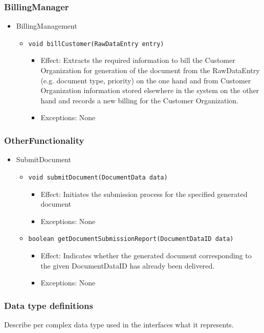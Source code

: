\documentclass[a4paper,10pt]{article}
\begin{document}
\subsubsection*{BillingManager}
\begin{itemize}
	\item BillingManagement
	\begin{itemize}
		\item \texttt{void billCustomer(RawDataEntry entry)}
		\begin{itemize}
			\item Effect: Extracts the required information to bill the Customer Organization for generation of the document from the RawDataEntry (e.g. document type, priority) on the one hand and from Customer Organization information stored elsewhere in the system on the other hand and records a new billing for the Customer Organization.
			\item Exceptions: None
		\end{itemize}
	\end{itemize}
\end{itemize}

\subsubsection*{OtherFunctionality}
\begin{itemize}
	\item SubmitDocument
	\begin{itemize}
		\item \texttt{void submitDocument(DocumentData data)}
		\begin{itemize}
			\item Effect: Initiates the submission process for the specified generated document
			\item Exceptions: None
		\end{itemize}
		
		\item \texttt{boolean getDocumentSubmissionReport(DocumentDataID data)}
		\begin{itemize}
			\item Effect: Indicates whether the generated document corresponding to the given DocumentDataID has already been delivered.
			\item Exceptions: None
		\end{itemize}
	\end{itemize}
\end{itemize}

\subsubsection{Data type definitions}
Describe per complex data type used in the interfaces what it represents.
\end{document}
